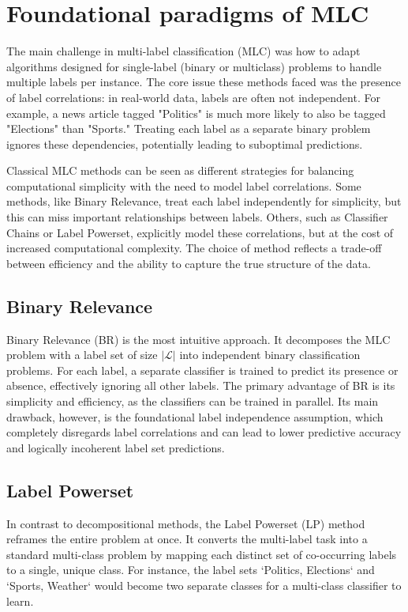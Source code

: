 \section{Foundational paradigms of MLC}
The main challenge in multi-label classification (MLC) was how to adapt algorithms designed for single-label (binary or multiclass) problems to handle multiple labels per instance. The core issue these methods faced was the presence of label correlations: in real-world data, labels are often not independent. For example, a news article tagged "Politics" is much more likely to also be tagged "Elections" than "Sports." Treating each label as a separate binary problem ignores these dependencies, potentially leading to suboptimal predictions.

Classical MLC methods can be seen as different strategies for balancing computational simplicity with the need to model label correlations. Some methods, like Binary Relevance, treat each label independently for simplicity, but this can miss important relationships between labels. Others, such as Classifier Chains or Label Powerset, explicitly model these correlations, but at the cost of increased computational complexity. The choice of method reflects a trade-off between efficiency and the ability to capture the true structure of the data.

\subsection{Binary Relevance}
Binary Relevance (BR) is the most intuitive approach. It decomposes the MLC problem with a label set of size $|\mathcal{L}|$ into independent binary classification problems. For each label, a separate classifier is trained to predict its presence or absence, effectively ignoring all other labels. \cite{zhang_binary_2018} The primary advantage of BR is its simplicity and efficiency, as the classifiers can be trained in parallel. Its main drawback, however, is the foundational label independence assumption, which completely disregards label correlations and can lead to lower predictive accuracy and logically incoherent label set predictions. \cite{Sucar2014Multi-label}

\subsection{Label Powerset}
In contrast to decompositional methods, the Label Powerset (LP) method reframes the entire problem at once. It converts the multi-label task into a standard multi-class problem by mapping each distinct set of co-occurring labels to a single, unique class. For instance, the label sets `{Politics, Elections}` and `{Sports, Weather}` would become two separate classes for a multi-class classifier to learn. \cite{Read2011}

